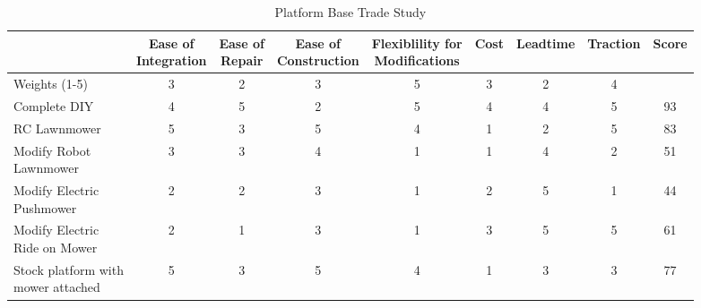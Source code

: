 \documentclass{article}
\begin{document}
		
		\begin{table}[H]
		\begin{adjustwidth}{-1.5in}{-1.5in}
		\centering
		\setlength{\dashlinedash}{.4pt}

		\begin{tabular}{|l|c|c|c|c|c|c|c|c|}
		\hline
		            & \makecell{Ease of \\ Integration} & \makecell{Ease of \\ Repair} & \makecell{Ease of \\ Construction} & \makecell{Flexiblility for \\ Modifications} & Cost & Leadtime & Traction & Score \\ \hline
		Weights (1-5)                      & 3                   & 2              & 3                    & 5                              & 3    & 2        & 4        &       \\ \hline
		\multicolumn{1}{|l|}{\cellcolor{lemonchiffon}Complete DIY} & \multicolumn{1}{c|}{\cellcolor{lemonchiffon}4}                   & \multicolumn{1}{c|}{\cellcolor{lemonchiffon}5}              & \multicolumn{1}{c|}{\cellcolor{lemonchiffon}2}                    & \multicolumn{1}{c|}{\cellcolor{lemonchiffon}5}                              & \multicolumn{1}{c|}{\cellcolor{lemonchiffon}4}    & \multicolumn{1}{c|}{\cellcolor{lemonchiffon}4}        & \multicolumn{1}{c|}{\cellcolor{lemonchiffon}5}        & \multicolumn{1}{c|}{\cellcolor{lemonchiffon}93}    \\ \hdashline
		RC Lawnmower                       & 5                   & 3              & 5                    & 4                              & 1    & 2        & 5        & 83    \\ \hdashline
		\makecell[l]{Modify Robot \\ Lawnmower}           & 3                   & 3              & 4                    & 1                              & 1    & 4        & 2        & 51    \\ \hdashline
		\makecell[l]{Modify Electric \\ Pushmower}         & 2                   & 2              & 3                    & 1                              & 2    & 5        & 1        & 44    \\ \hdashline
		\makecell[l]{Modify Electric \\ Ride on Mower}      & 2                   & 1              & 3                    & 1                              & 3    & 5        & 5        & 61    \\ \hdashline
		\makecell[l]{Stock platform with \\ mower attached} & 5                   & 3              & 5                    & 4                              & 1    & 3        & 3        & 77    \\ \hline
		\end{tabular}
		\caption{Platform Base Trade Study}
		\label{my-label}
		\end{adjustwidth}
		\end{table}
\end{document}
